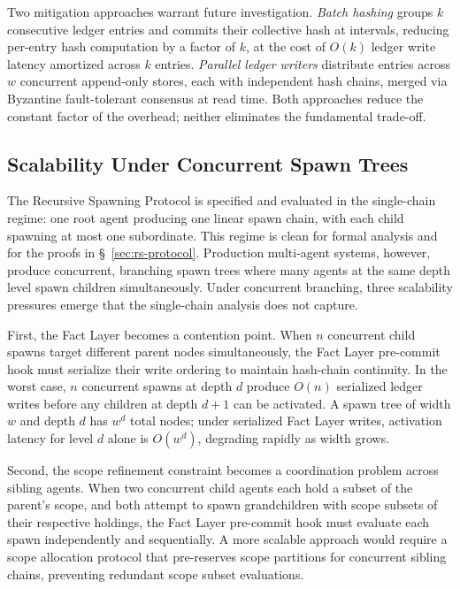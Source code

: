 Two mitigation approaches warrant future investigation. \emph{Batch hashing} groups $k$ consecutive ledger entries and commits their collective hash at intervals, reducing per-entry hash computation by a factor of $k$, at the cost of $O(k)$ ledger write latency amortized across $k$ entries. \emph{Parallel ledger writers} distribute entries across $w$ concurrent append-only stores, each with independent hash chains, merged via Byzantine fault-tolerant consensus at read time. Both approaches reduce the constant factor of the overhead; neither eliminates the fundamental trade-off.

\subsection{Scalability Under Concurrent Spawn Trees}
\label{sec:scalability}

The Recursive Spawning Protocol is specified and evaluated in the single-chain regime: one root agent producing one linear spawn chain, with each child spawning at most one subordinate. This regime is clean for formal analysis and for the proofs in \S~\ref{sec:rs-protocol}. Production multi-agent systems, however, produce concurrent, branching spawn trees where many agents at the same depth level spawn children simultaneously. Under concurrent branching, three scalability pressures emerge that the single-chain analysis does not capture.

First, the Fact Layer becomes a contention point. When $n$ concurrent child spawns target different parent nodes simultaneously, the Fact Layer pre-commit hook must serialize their write ordering to maintain hash-chain continuity. In the worst case, $n$ concurrent spawns at depth $d$ produce $O(n)$ serialized ledger writes before any children at depth $d+1$ can be activated. A spawn tree of width $w$ and depth $d$ has $w^d$ total nodes; under serialized Fact Layer writes, activation latency for level $d$ alone is $O(w^d)$, degrading rapidly as width grows.

Second, the scope refinement constraint becomes a coordination problem across sibling agents. When two concurrent child agents each hold a subset of the parent's scope, and both attempt to spawn grandchildren with scope subsets of their respective holdings, the Fact Layer pre-commit hook must evaluate each spawn independently and sequentially. A more scalable approach would require a scope allocation protocol that pre-reserves scope partitions for concurrent sibling chains, preventing redundant scope subset evaluations.

